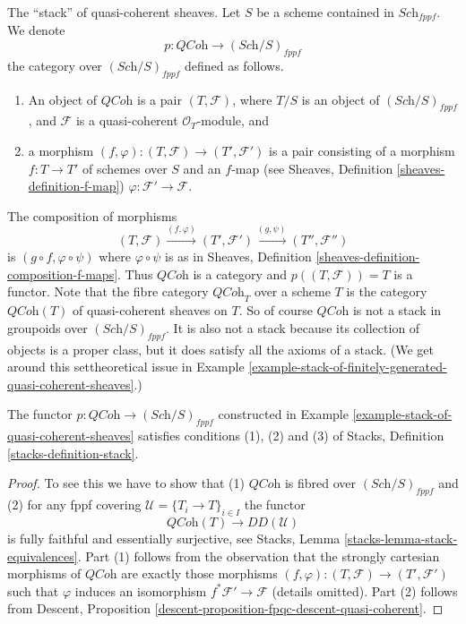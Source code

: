 \begin{example}
\label{example-stack-of-quasi-coherent-sheaves}
The ``stack'' of quasi-coherent sheaves.
Let $S$ be a scheme contained in $\textit{Sch}_{fppf}$.
We denote
$$
p : \textit{QCoh} \to (\textit{Sch}/S)_{fppf}
$$
the category over $(\textit{Sch}/S)_{fppf}$ defined as follows.
\begin{enumerate}
\item An object of $\textit{QCoh}$ is a pair $(T, \mathcal{F})$,
where $T/S$ is an object of $(\textit{Sch}/S)_{fppf}$, and $\mathcal{F}$
is a quasi-coherent $\mathcal{O}_T$-module, and
\item a morphism $(f, \varphi) : (T, \mathcal{F}) \to (T', \mathcal{F}')$
is a pair consisting of a morphism $f : T \to T'$ of schemes over $S$
and an $f$-map (see
Sheaves, Definition \ref{sheaves-definition-f-map})
$\varphi : \mathcal{F}' \to \mathcal{F}$.
\end{enumerate}
The composition of morphisms
$$
(T, \mathcal{F}) \xrightarrow{(f, \varphi)}
(T', \mathcal{F}') \xrightarrow{(g, \psi)} (T'', \mathcal{F}'')
$$
is $(g \circ f, \varphi \circ \psi)$ where $\varphi \circ \psi$ is
as in
Sheaves, Definition \ref{sheaves-definition-composition-f-maps}.
Thus $\textit{QCoh}$ is a category and $p((T, \mathcal{F})) = T$
is a functor. Note that the fibre category $\textit{QCoh}_T$ over
a scheme $T$ is the category $\textit{QCoh}(T)$ of quasi-coherent
sheaves on $T$. So of course $\textit{QCoh}$ is not a stack in
groupoids over $(\textit{Sch}/S)_{fppf}$. It is also not a stack
because its collection of objects is a proper class, but it does
satisfy all the axioms of a stack. (We get around this
settheoretical issue in
Example \ref{example-stack-of-finitely-generated-quasi-coherent-sheaves}.)
\end{example}

\begin{lemma}
\label{lemma-stack-of-quasi-coherent-sheaves}
The functor $p : \textit{QCoh} \to (\textit{Sch}/S)_{fppf}$
constructed in Example \ref{example-stack-of-quasi-coherent-sheaves}
satisfies conditions (1), (2) and (3) of
Stacks, Definition \ref{stacks-definition-stack}.
\end{lemma}

\begin{proof}
To see this we have to show that (1) $\textit{QCoh}$ is fibred over
$(\textit{Sch}/S)_{fppf}$ and (2) for any fppf covering
$\mathcal{U} = \{T_i \to T\}_{i \in I}$ the functor
$$
\textit{QCoh}(T) \longrightarrow DD(\mathcal{U})
$$
is fully faithful and essentially surjective, see
Stacks, Lemma \ref{stacks-lemma-stack-equivalences}.
Part (1) follows from the observation that the strongly cartesian morphisms
of $\textit{QCoh}$ are exactly those morphisms
$(f, \varphi) : (T, \mathcal{F}) \to (T', \mathcal{F}')$
such that $\varphi$ induces an isomorphism
$f^*\mathcal{F}' \to \mathcal{F}$ (details omitted).
Part (2) follows from
Descent, Proposition \ref{descent-proposition-fpqc-descent-quasi-coherent}.
\end{proof}


